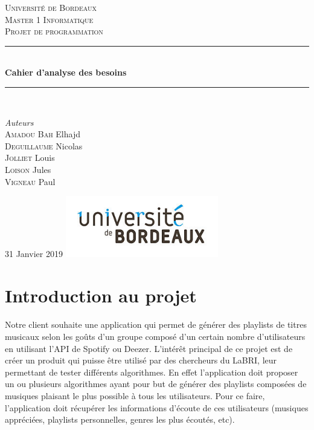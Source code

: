 \documentclass{article}
\begin{document}
\begin{titlepage}
	\newcommand{\HRule}{\rule{\linewidth}{0.5mm}}
		
	\center
		
	\textsc{\LARGE Université de Bordeaux}\\[1.5cm]
		
	\textsc{\Large Master 1 Informatique}\\[0.5cm]
		
	\textsc{\large Projet de programmation}\\[0.5cm]
		
	\HRule\\[0.4cm]
		
	{\huge\bfseries Cahier d'analyse des besoins}\\[0.4cm]
	\HRule\\[1.5cm]
		
	\begin{minipage}{0.4\textwidth}
		\begin{flushleft}
			\large
			\textit{Auteurs}\\
		    \textsc{Amadou Bah}  Elhajd 
			\\
			\textsc{Deguillaume} Nicolas
			\\
			\textsc{Jolliet} Louis
			\\
			\textsc{Loison} Jules 
			\\
			\textsc{Vigneau} Paul 
		\end{flushleft}
	\end{minipage}
	\vfill\vfill\vfill
		
	{\large 31 Janvier 2019}
	\vfill\vfill
	\includegraphics[width=0.5\textwidth]{ressources/Logo.jpg}\\[1cm]
		\vfill
		\end{titlepage}
		\justify
		\renewcommand{\contentsname}{Table des matières}
		\tableofcontents
		\newpage
		
		\section{Introduction au projet}
		\paragraph{}
		Notre client souhaite une application qui permet de générer des playlists de titres musicaux selon les goûts d'un groupe composé d'un certain nombre d'utilisateurs en utilisant l'API de Spotify ou Deezer. L'intérêt principal de ce projet est de créer un produit qui puisse être utilisé par des chercheurs du LaBRI, leur permettant de tester différents algorithmes. En effet l'application doit proposer un ou plusieurs algorithmes ayant pour but de générer des playlists composées de musiques plaisant le plus possible à tous les utilisateurs. Pour ce faire, l'application doit récupérer les informations d'écoute de ces utilisateurs (musiques appréciées, playlists personnelles, genres les plus écoutés, etc). 
		    
\end{document}
